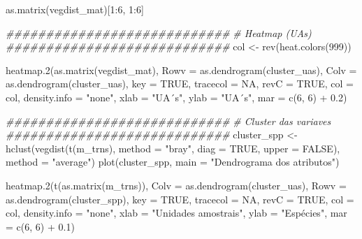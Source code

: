 \documentclass[
  letterpaper,
  DIV=11,
  numbers=noendperiod]{scrartcl}
\newenvironment{Shaded}{}{}
\newcommand{\AttributeTok}[1]{\textcolor[rgb]{0.49,0.56,0.16}{#1}}
\newcommand{\CommentTok}[1]{\textcolor[rgb]{0.38,0.63,0.69}{\textit{#1}}}
\newcommand{\ConstantTok}[1]{\textcolor[rgb]{0.53,0.00,0.00}{#1}}
\newcommand{\DecValTok}[1]{\textcolor[rgb]{0.25,0.63,0.44}{#1}}
\newcommand{\DocumentationTok}[1]{\textcolor[rgb]{0.73,0.13,0.13}{\textit{#1}}}
\newcommand{\FloatTok}[1]{\textcolor[rgb]{0.25,0.63,0.44}{#1}}
\newcommand{\FunctionTok}[1]{\textcolor[rgb]{0.02,0.16,0.49}{#1}}
\newcommand{\NormalTok}[1]{#1}
\newcommand{\OtherTok}[1]{\textcolor[rgb]{0.00,0.44,0.13}{#1}}
\newcommand{\SpecialCharTok}[1]{\textcolor[rgb]{0.25,0.44,0.63}{#1}}
\newcommand{\StringTok}[1]{\textcolor[rgb]{0.25,0.44,0.63}{#1}}
\begin{document}
\begin{Shaded}
\begin{Highlighting}[numbers=left,,]
\FunctionTok{as.matrix}\NormalTok{(vegdist\_mat)[}\DecValTok{1}\SpecialCharTok{:}\DecValTok{6}\NormalTok{, }\DecValTok{1}\SpecialCharTok{:}\DecValTok{6}\NormalTok{]}

\DocumentationTok{\#\#\#\#\#\#\#\#\#\#\#\#\#\#\#\#\#\#\#\#\#\#\#\#\#\#\#\#}
\CommentTok{\# Heatmap (UAs)}
\DocumentationTok{\#\#\#\#\#\#\#\#\#\#\#\#\#\#\#\#\#\#\#\#\#\#\#\#\#\#\#\#}
\NormalTok{col }\OtherTok{\textless{}{-}} \FunctionTok{rev}\NormalTok{(}\FunctionTok{heat.colors}\NormalTok{(}\DecValTok{999}\NormalTok{))}

\FunctionTok{heatmap.2}\NormalTok{(}\FunctionTok{as.matrix}\NormalTok{(vegdist\_mat),}
          \AttributeTok{Rowv =} \FunctionTok{as.dendrogram}\NormalTok{(cluster\_uas),}
          \AttributeTok{Colv =} \FunctionTok{as.dendrogram}\NormalTok{(cluster\_uas),}
          \AttributeTok{key =} \ConstantTok{TRUE}\NormalTok{, }\AttributeTok{tracecol =} \ConstantTok{NA}\NormalTok{, }\AttributeTok{revC =} \ConstantTok{TRUE}\NormalTok{,}
          \AttributeTok{col =}\NormalTok{ col,}
          \AttributeTok{density.info =} \StringTok{"none"}\NormalTok{,}
          \AttributeTok{xlab =} \StringTok{"UA´s"}\NormalTok{, }\AttributeTok{ylab =} \StringTok{"UA´s"}\NormalTok{,}
          \AttributeTok{mar =} \FunctionTok{c}\NormalTok{(}\DecValTok{6}\NormalTok{, }\DecValTok{6}\NormalTok{) }\SpecialCharTok{+} \FloatTok{0.2}\NormalTok{)}

\DocumentationTok{\#\#\#\#\#\#\#\#\#\#\#\#\#\#\#\#\#\#\#\#\#\#\#\#\#\#\#\#}
\CommentTok{\# Cluster das variaves}
\DocumentationTok{\#\#\#\#\#\#\#\#\#\#\#\#\#\#\#\#\#\#\#\#\#\#\#\#\#\#\#\#}
\NormalTok{cluster\_spp }\OtherTok{\textless{}{-}} \FunctionTok{hclust}\NormalTok{(}\FunctionTok{vegdist}\NormalTok{(}\FunctionTok{t}\NormalTok{(m\_trns), }\AttributeTok{method =} \StringTok{"bray"}\NormalTok{, }\AttributeTok{diag =} \ConstantTok{TRUE}\NormalTok{, }\AttributeTok{upper =} \ConstantTok{FALSE}\NormalTok{),}
                      \AttributeTok{method =} \StringTok{"average"}\NormalTok{)}
\FunctionTok{plot}\NormalTok{(cluster\_spp, }\AttributeTok{main =} \StringTok{"Dendrograma dos atributos"}\NormalTok{)}

\FunctionTok{heatmap.2}\NormalTok{(}\FunctionTok{t}\NormalTok{(}\FunctionTok{as.matrix}\NormalTok{(m\_trns)),}
          \AttributeTok{Colv =} \FunctionTok{as.dendrogram}\NormalTok{(cluster\_uas),}
          \AttributeTok{Rowv =} \FunctionTok{as.dendrogram}\NormalTok{(cluster\_spp),}
          \AttributeTok{key =} \ConstantTok{TRUE}\NormalTok{, }\AttributeTok{tracecol =} \ConstantTok{NA}\NormalTok{, }\AttributeTok{revC =} \ConstantTok{TRUE}\NormalTok{,}
          \AttributeTok{col =}\NormalTok{ col,}
          \AttributeTok{density.info =} \StringTok{"none"}\NormalTok{,}
          \AttributeTok{xlab =} \StringTok{"Unidades amostrais"}\NormalTok{, }\AttributeTok{ylab =} \StringTok{"Espécies"}\NormalTok{,}
          \AttributeTok{mar =} \FunctionTok{c}\NormalTok{(}\DecValTok{6}\NormalTok{, }\DecValTok{6}\NormalTok{) }\SpecialCharTok{+} \FloatTok{0.1}\NormalTok{)}


\end{Highlighting}
\end{Shaded}
\end{document}
